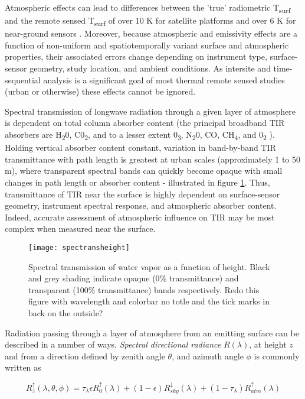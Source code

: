Atmospheric effects can lead to differences between the 'true' radiometric T\textsubscript{surf} and the remote sensed T\textsubscript{surf} of over 10 \si{K} for satellite platforms \cite{Cooper1989} and over 6 \si{K} for near-ground sensors \cite{Meier2011}. Moreover, because atmospheric and emissivity effects are a function of non-uniform and spatiotemporally variant surface and atmospheric properties, their associated errors change depending on instrument type, surface-sensor geometry, study location, and ambient conditions. As intersite and time-sequential analysis is a significant goal of most thermal remote sensed studies (urban or otherwise) these effects cannot be ignored.

Spectral transmission of longwave radiation through a given layer of atmosphere is dependent on total column absorber content (the principal broadband TIR absorbers are H\textsubscript{2}0, C0\textsubscript{2}, and to a lesser extent 0\textsubscript{3}, N\textsubscript{2}0, CO, CH\textsubscript{4}, and 0\textsubscript{2} \cite{Miskolczi1993}). Holding vertical absorber content constant, variation in band-by-band TIR transmittance with path length is greatest at urban scales (approximately 1 to 50 \si{m}), where transparent spectral bands can quickly become opaque with small changes in path length or absorber content - illustrated in figure \ref{spectransheight}. Thus, transmittance of TIR near the surface is highly dependent on surface-sensor geometry, instrument spectral response, and atmospheric absorber content. Indeed, accurate assessment of atmospheric influence on TIR may be most complex when measured near the surface.

\begin{figure}[H]
	\texttt{[image: spectransheight]}
	\caption{Spectral transmission of water vapor as a function of height. Black and grey shading indicate opaque (0\% transmittance) and transparent (100\% transmittance) bands respectively. Redo this figure with wavelength and colorbar no totle and the tick marks in back on the outside?}
	\label{spectransheight}
\end{figure}

Radiation passing through a layer of atmosphere from an emitting surface can be described in a number of ways. \textit{Spectral directional radiance} $ R (\lambda)$, at height $ z $ and from a direction defined by zenith angle \(\theta\), and azimuth angle \(\phi\) is commonly written as

\begin{equation}
R^\uparrow_z (\lambda, \theta, \phi) = \tau_\lambda \epsilon R^\uparrow_0(\lambda) + (1-\epsilon) R^\downarrow_{sky} (\lambda) + (1-\tau_\lambda) R^\uparrow_{atm}(\lambda)
\end{equation}

